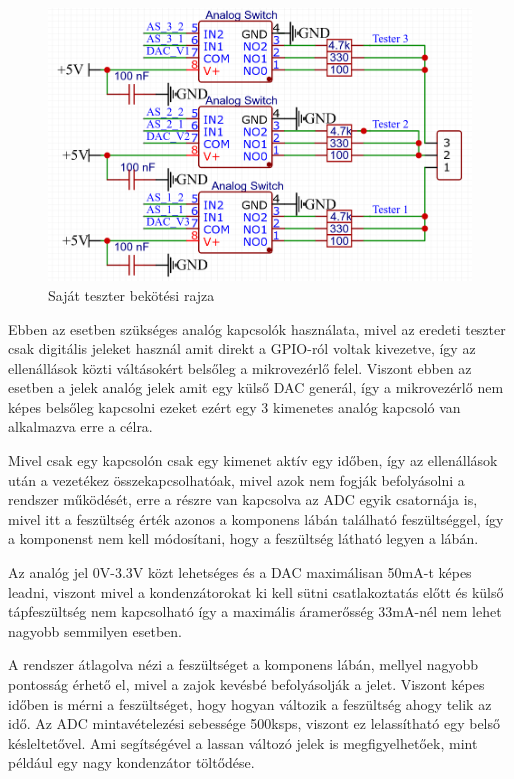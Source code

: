 \begin{figure}[H]
    \centering
    \includegraphics[scale=0.3]{figures/images/literature/TeszterConnections.png}
    \caption{Saját teszter bekötési rajza}
    \label{fig:ownTesterConnection}
\end{figure}

Ebben az esetben szükséges analóg kapcsolók használata, mivel az eredeti
teszter csak digitális jeleket használ amit direkt a GPIO-ról voltak kivezetve,
így az ellenállások közti váltásokért belsőleg a mikrovezérlő felel. Viszont ebben
az esetben a jelek analóg jelek amit egy külső DAC generál, így a mikrovezérlő nem
képes belsőleg kapcsolni ezeket ezért egy 3 kimenetes analóg kapcsoló van alkalmazva
erre a célra.

Mivel csak egy kapcsolón csak egy kimenet aktív egy időben, így az ellenállások után
a vezetékez összekapcsolhatóak, mivel azok nem fogják befolyásolni a rendszer működését,
erre a részre van kapcsolva az ADC egyik csatornája is, mivel itt a feszültség érték
azonos a komponens lábán található feszültséggel, így a komponenst nem kell módosítani,
hogy a feszültség látható legyen a lábán.

Az analóg jel 0V-3.3V közt lehetséges és a DAC maximálisan 50mA-t képes leadni, viszont
mivel a kondenzátorokat ki kell sütni csatlakoztatás előtt és külső tápfeszültség nem 
kapcsolható így a maximális áramerősség 33mA-nél nem lehet nagyobb semmilyen esetben.

A rendszer átlagolva nézi a feszültséget a komponens lábán, mellyel nagyobb pontosság
érhető el, mivel a zajok kevésbé befolyásolják a jelet. Viszont képes időben is mérni
a feszültséget, hogy hogyan változik a feszültség ahogy telik az idő. Az ADC mintavételezési sebessége 500ksps, 
viszont ez lelassítható egy belső késleltetővel. Ami segítségével
a lassan változó jelek is megfigyelhetőek, mint például egy nagy kondenzátor töltődése.

